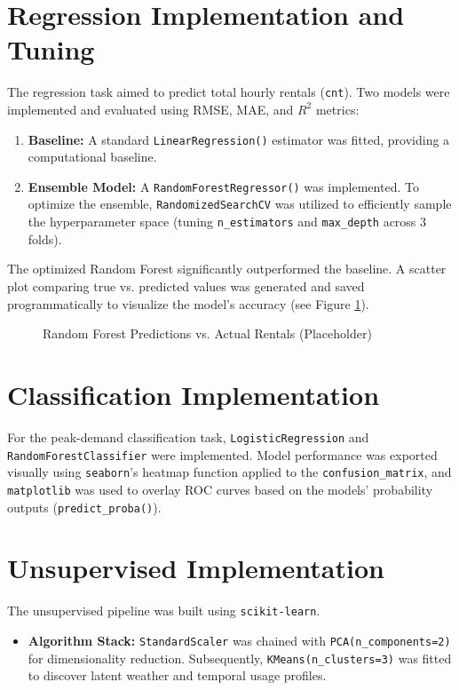 \documentclass[12pt,a4paper]{article}
\begin{document}
\section{Regression Implementation and Tuning}
The regression task aimed to predict total hourly rentals (\texttt{cnt}). Two models were implemented and evaluated using RMSE, MAE, and $R^2$ metrics:
\begin{enumerate}
    \item \textbf{Baseline:} A standard \texttt{LinearRegression()} estimator was fitted, providing a computational baseline.
    \item \textbf{Ensemble Model:} A \texttt{RandomForestRegressor()} was implemented. To optimize the ensemble, \texttt{RandomizedSearchCV} was utilized to efficiently sample the hyperparameter space (tuning \texttt{n\_estimators} and \texttt{max\_depth} across 3 folds).
\end{enumerate}

The optimized Random Forest significantly outperformed the baseline. A scatter plot comparing true vs. predicted values was generated and saved programmatically to visualize the model's accuracy (see Figure \ref{fig:regression_results}).

\begin{figure}[h]
    \centering
    \caption{Random Forest Predictions vs. Actual Rentals (Placeholder)}
    \label{fig:regression_results}
\end{figure}

\section{Classification Implementation}
For the peak-demand classification task, \texttt{LogisticRegression} and \texttt{RandomForestClassifier} were implemented. Model performance was exported visually using \texttt{seaborn}'s heatmap function applied to the \texttt{confusion\_matrix}, and \texttt{matplotlib} was used to overlay ROC curves based on the models' probability outputs (\texttt{predict\_proba()}).


\section{Unsupervised Implementation}
The unsupervised pipeline was built using \texttt{scikit-learn}.
\begin{itemize}
    \item \textbf{Algorithm Stack:} \texttt{StandardScaler} was chained with \texttt{PCA(n\_components=2)} for dimensionality reduction. Subsequently, \texttt{KMeans(n\_clusters=3)} was fitted to discover latent weather and temporal usage profiles.
\end{itemize}
\end{document}

